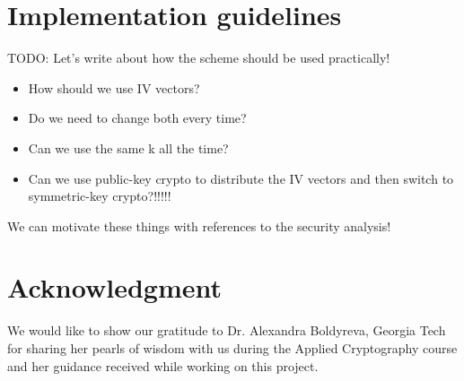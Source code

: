 \documentclass[conference]{IEEEtran}
\begin{document}
\section{Implementation guidelines}

TODO: Let’s write about how the scheme should be used practically!
\begin{itemize}
  \item How should we use IV vectors?
  \item Do we need to change both every time?
  \item Can we use the same k all the time?
  \item Can we use public-key crypto to distribute the IV vectors and then switch to symmetric-key crypto?!!!!!
\end{itemize}
We can motivate these things with references to the security analysis!



\section*{Acknowledgment}

We would like to show our gratitude to Dr. Alexandra Boldyreva, Georgia Tech for sharing her pearls of wisdom with us during the Applied Cryptography course and her guidance received while working on this project.








%
%
%

\end{document}

